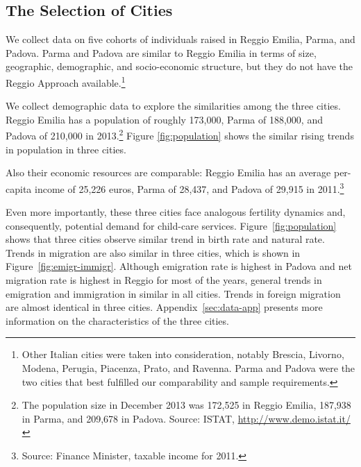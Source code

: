 \subsection{The Selection of Cities}

We collect data on five cohorts of individuals raised in Reggio Emilia, Parma, and Padova. Parma and Padova are similar to Reggio Emilia in terms of size, geographic, demographic, and socio-economic structure, but they do not have the Reggio Approach available.\footnote{Other Italian cities were taken into consideration, notably Brescia, Livorno, Modena, Perugia, Piacenza, Prato, and Ravenna. Parma and Padova were the two cities that best fulfilled our comparability and sample requirements.} 

We collect demographic data to explore the similarities among the three cities. Reggio Emilia has a population of roughly 173,000, Parma of 188,000, and Padova of 210,000 in 2013.\footnote{The population size in December 2013 was 172,525 in Reggio Emilia, 187,938 in Parma, and 209,678 in Padova. Source: ISTAT, \url{http://www.demo.istat.it/}} Figure \ref{fig:population} shows the similar rising trends in population in three cities. 

Also their economic resources are comparable: Reggio Emilia has an average per-capita income of 25,226 euros, Parma of 28,437, and Padova of 29,915 in 2011.\footnote{Source: Finance Minister, taxable income for 2011.}

Even more importantly, these three cities face analogous fertility dynamics and, consequently, potential demand for child-care services. Figure~\ref{fig:population} shows that three cities observe similar trend in birth rate and natural rate. Trends in migration are also similar in three cities, which is shown in Figure~\ref{fig:emigr-immigr}. Although emigration rate is highest in Padova and net migration rate is highest in Reggio for most of the years, general trends in emigration and immigration in similar in all cities. Trends in foreign migration are almost identical in three cities. Appendix~\ref{sec:data-app} presents more information on the characteristics of the three cities.

